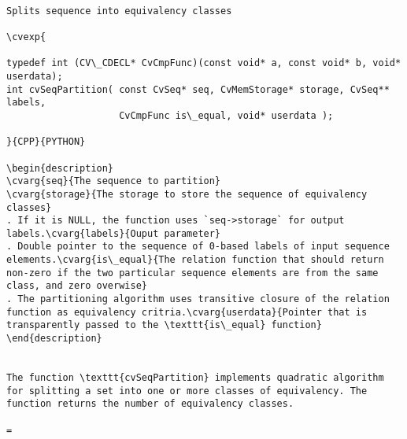 \begin{verbatim}

Splits sequence into equivalency classes

\cvexp{

typedef int (CV\_CDECL* CvCmpFunc)(const void* a, const void* b, void* userdata);
int cvSeqPartition( const CvSeq* seq, CvMemStorage* storage, CvSeq** labels,
                    CvCmpFunc is\_equal, void* userdata );

}{CPP}{PYTHON}

\begin{description}
\cvarg{seq}{The sequence to partition}
\cvarg{storage}{The storage to store the sequence of equivalency classes}
. If it is NULL, the function uses `seq->storage` for output labels.\cvarg{labels}{Ouput parameter}
. Double pointer to the sequence of 0-based labels of input sequence elements.\cvarg{is\_equal}{The relation function that should return non-zero if the two particular sequence elements are from the same class, and zero overwise}
. The partitioning algorithm uses transitive closure of the relation function as equivalency critria.\cvarg{userdata}{Pointer that is transparently passed to the \texttt{is\_equal} function}
\end{description}


The function \texttt{cvSeqPartition} implements quadratic algorithm for splitting a set into one or more classes of equivalency. The function returns the number of equivalency classes.

=\end{verbatim}
